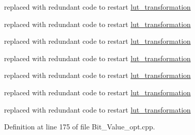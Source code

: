 replaced with redundant code to restart \hyperlink{classlut__transformation}{lut\+\_\+transformation}

replaced with redundant code to restart \hyperlink{classlut__transformation}{lut\+\_\+transformation}

replaced with redundant code to restart \hyperlink{classlut__transformation}{lut\+\_\+transformation}

replaced with redundant code to restart \hyperlink{classlut__transformation}{lut\+\_\+transformation}

replaced with redundant code to restart \hyperlink{classlut__transformation}{lut\+\_\+transformation}

replaced with redundant code to restart \hyperlink{classlut__transformation}{lut\+\_\+transformation}

replaced with redundant code to restart \hyperlink{classlut__transformation}{lut\+\_\+transformation} 

Definition at line 175 of file Bit\+\_\+\+Value\+\_\+opt.\+cpp.



